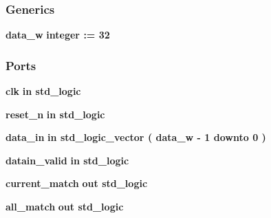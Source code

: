 \subsubsection*{Generics}
 \begin{DoxyCompactItemize}
\item 
{\bf data\+\_\+w} {\bfseries {\bfseries \textcolor{comment}{integer}\textcolor{vhdlchar}{ }\textcolor{vhdlchar}{ }\textcolor{vhdlchar}{\+:}\textcolor{vhdlchar}{=}\textcolor{vhdlchar}{ }\textcolor{vhdlchar}{ } \textcolor{vhdldigit}{32} \textcolor{vhdlchar}{ }}}
\end{DoxyCompactItemize}
\subsubsection*{Ports}
 \begin{DoxyCompactItemize}
\item 
{\bf clk}  {\bfseries {\bfseries \textcolor{keywordflow}{in}\textcolor{vhdlchar}{ }}} {\bfseries \textcolor{comment}{std\+\_\+logic}\textcolor{vhdlchar}{ }} 
\item 
{\bf reset\+\_\+n}  {\bfseries {\bfseries \textcolor{keywordflow}{in}\textcolor{vhdlchar}{ }}} {\bfseries \textcolor{comment}{std\+\_\+logic}\textcolor{vhdlchar}{ }} 
\item 
{\bf data\+\_\+in}  {\bfseries {\bfseries \textcolor{keywordflow}{in}\textcolor{vhdlchar}{ }}} {\bfseries \textcolor{comment}{std\+\_\+logic\+\_\+vector}\textcolor{vhdlchar}{ }\textcolor{vhdlchar}{(}\textcolor{vhdlchar}{ }\textcolor{vhdlchar}{ }\textcolor{vhdlchar}{ }\textcolor{vhdlchar}{ }{\bfseries {\bf data\+\_\+w}} \textcolor{vhdlchar}{-\/}\textcolor{vhdlchar}{ } \textcolor{vhdldigit}{1} \textcolor{vhdlchar}{ }\textcolor{keywordflow}{downto}\textcolor{vhdlchar}{ }\textcolor{vhdlchar}{ } \textcolor{vhdldigit}{0} \textcolor{vhdlchar}{ }\textcolor{vhdlchar}{)}\textcolor{vhdlchar}{ }} 
\item 
{\bf datain\+\_\+valid}  {\bfseries {\bfseries \textcolor{keywordflow}{in}\textcolor{vhdlchar}{ }}} {\bfseries \textcolor{comment}{std\+\_\+logic}\textcolor{vhdlchar}{ }} 
\item 
{\bf current\+\_\+match}  {\bfseries {\bfseries \textcolor{keywordflow}{out}\textcolor{vhdlchar}{ }}} {\bfseries \textcolor{comment}{std\+\_\+logic}\textcolor{vhdlchar}{ }} 
\item 
{\bf all\+\_\+match}  {\bfseries {\bfseries \textcolor{keywordflow}{out}\textcolor{vhdlchar}{ }}} {\bfseries \textcolor{comment}{std\+\_\+logic}\textcolor{vhdlchar}{ }} 
\end{DoxyCompactItemize}


